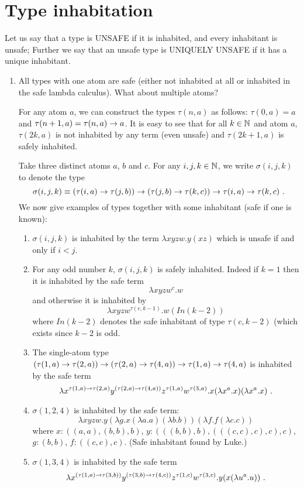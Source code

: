 \documentclass{article}
\begin{document}
\section{Type inhabitation}

Let us say that a type is UNSAFE if it is inhabited, and every
inhabitant is unsafe; Further we say that an unsafe type is UNIQUELY
UNSAFE if it has a unique inhabitant.

\begin{enumerate}

\item All types with one atom are safe (either not inhabited at all or inhabited in the safe lambda calculus). What about multiple atoms?

For any atom $a$, we can construct the types $\tau(n,a)$
as follows: $\tau(0,a) = a$ and $\tau(n+1,a) = \tau(n,a) \rightarrow a$.
It is easy to see that for all $k\in\mathbb{N}$ and atom $a$, $\tau(2k,a)$ is not inhabited by any term (even unsafe) and $\tau(2k+1,a)$ is safely inhabited.

Take three distinct atoms $a$, $b$ and $c$. For any $i,j,k\in\mathbb{N}$, we write $\sigma(i,j,k)$ to denote the type
$$\sigma(i,j,k) \equiv (\tau(i,a) \rightarrow \tau(j,b)) \rightarrow (\tau(j,b) \rightarrow \tau(k,c)) \rightarrow \tau(i,a) \rightarrow
\tau(k,c) \ .$$
We now give examples of types together with some inhabitant (safe if one is known):
\begin{enumerate}
\item $\sigma(i,j,k)$ is inhabited by the term $\lambda x y z w . y (x z)$ which is unsafe if and only if $i<j$.

\item For any odd number $k$, $\sigma(i,j,k)$ is safely inhabited. Indeed if $k=1$ then it is inhabited by the safe term
    $$\lambda x y z w^c. w$$
    and otherwise it is inhabited by
    $$\lambda x y z w^{\tau(c,k-1)}. w (In(k-2))$$
    where $In(k-2)$ denotes the safe inhabitant of type $\tau(c,k-2)$ (which exists since $k-2$ is odd.

\item The single-atom type
$(\tau(1,a) \rightarrow \tau(2,a)) \rightarrow (\tau(2,a) \rightarrow \tau(4,a)) \rightarrow \tau(1,a) \rightarrow
\tau(4,a)$ is inhabited by the safe term $$\lambda x^{\tau(1,a)
\typear \tau(2,a)} y^{(\tau(2,a) \typear \tau(4,a))} z^{\tau(1,a)}
w^{\tau(3,a)} . x (\lambda x^a . x) (\lambda x^a . x)\ .$$

\item $\sigma(1,2,4)$
is inhabited by the safe term:
$$ \lambda x y z w . y (\lambda g . x (\lambda a . a) (\lambda b . b)) (\lambda f . f (\lambda c . c))$$
where
$x : ((a, a), (b, b), b)$,
$y : (((b, b), b), (((c, c), c), c), c)$,
$g : (b, b)$,
$f : ((c, c), c)$. (Safe inhabitant found by Luke.)
\item
$\sigma(1,3,4)$
is inhabited by the safe term
$$ \lambda x^{(\tau(1,a) \typear \tau(3,b))} y^{(\tau(3,b) \typear \tau(4,c))} z^{\tau(1,c)} w^{\tau(3,c)} . y (x (\lambda u^a . u)) \ .$$


\end{enumerate}
\end{enumerate}
\end{document}
